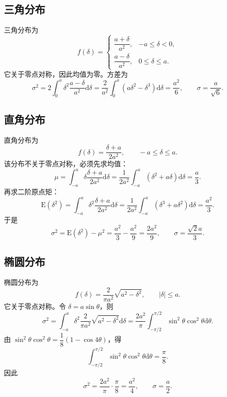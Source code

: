 \documentclass[UTF8,12pt,a4paper]{ctexart}
\newcommand{\dd}{\mathrm{d}}
\newcommand{\E}{\mathrm{E}}
\newcommand{\abs}[1]{\left|#1\right|}
\begin{document}
\subsection{三角分布}
三角分布为
\begin{equation*}
f(\delta)=
\begin{cases}
\dfrac{a+\delta}{a^2}, & -a\le \delta<0,\\[4pt]
\dfrac{a-\delta}{a^2}, & 0\le \delta\le a .
\end{cases}
\end{equation*}
它关于零点对称，因此均值为零。方差为
\begin{equation*}
\sigma^2=2\int_{0}^{a}\delta^2\frac{a-\delta}{a^2}\dd\delta
=\frac{2}{a^2}\int_{0}^{a}(a\delta^2-\delta^3)\dd\delta
=\frac{a^2}{6},\qquad
\sigma=\frac{a}{\sqrt{6}} .
\end{equation*}

\subsection{直角分布}
直角分布为
\begin{equation*}
f(\delta)=\frac{\delta+a}{2a^2},\qquad -a\le \delta\le a .
\end{equation*}
该分布不关于零点对称，必须先求均值：
\begin{equation*}
\mu=\int_{-a}^{a}\delta\frac{\delta+a}{2a^2}\dd\delta
=\frac{1}{2a^2}\int_{-a}^{a}(\delta^2+a\delta)\dd\delta
=\frac{a}{3} .
\end{equation*}
再求二阶原点矩：
\begin{equation*}
\E(\delta^2)=\int_{-a}^{a}\delta^2\frac{\delta+a}{2a^2}\dd\delta
=\frac{1}{2a^2}\int_{-a}^{a}(\delta^3+a\delta^2)\dd\delta
=\frac{a^2}{3} .
\end{equation*}
于是
\begin{equation*}
\sigma^2=\E(\delta^2)-\mu^2=\frac{a^2}{3}-\frac{a^2}{9}=\frac{2a^2}{9},
\qquad
\sigma=\frac{\sqrt{2}a}{3} .
\end{equation*}

\subsection{椭圆分布}
椭圆分布为
\begin{equation*}
f(\delta)=\frac{2}{\pi a^2}\sqrt{a^2-\delta^2},\qquad \abs{\delta}\le a .
\end{equation*}
它关于零点对称。令 $\delta=a\sin\theta$，则
\begin{equation*}
\sigma^2=\int_{-a}^{a}\delta^2\frac{2}{\pi a^2}\sqrt{a^2-\delta^2}\dd\delta
=\frac{2a^2}{\pi}\int_{-\pi/2}^{\pi/2}\sin^2\theta\cos^2\theta\dd\theta .
\end{equation*}
由 $\sin^2\theta\cos^2\theta=\dfrac{1}{8}(1-\cos4\theta)$，得
\begin{equation*}
\int_{-\pi/2}^{\pi/2}\sin^2\theta\cos^2\theta\dd\theta=\frac{\pi}{8}.
\end{equation*}
因此
\begin{equation*}
\sigma^2=\frac{2a^2}{\pi}\cdot\frac{\pi}{8}=\frac{a^2}{4},
\qquad
\sigma=\frac{a}{2} .
\end{equation*}
\end{document}
